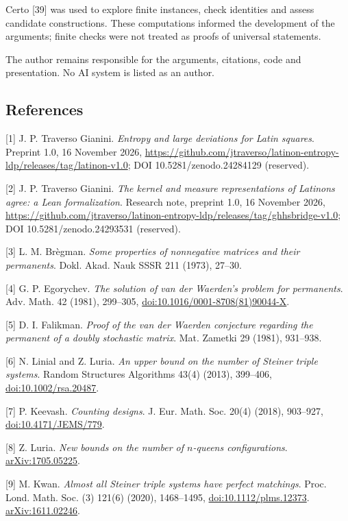 \documentclass[english,11pt,a4paper]{article}
\begin{document}
Certo {[}39{]} was used to explore finite instances, check identities and assess candidate constructions. These computations informed the development of the arguments; finite checks were not treated as proofs of universal statements.

The author remains responsible for the arguments, citations, code and presentation. No AI system is listed as an author.

\subsection{References}\label{references}
\begingroup\small\sloppy

{[}1{]} J. P. Traverso Gianini. \emph{Entropy and large deviations for Latin squares}. Preprint 1.0, 16 November 2026, \url{https://github.com/jtraverso/latinon-entropy-ldp/releases/tag/latinon-v1.0}; DOI 10.5281/zenodo.24284129 (reserved).

{[}2{]} J. P. Traverso Gianini. \emph{The kernel and measure representations of Latinons agree: a Lean formalization}. Research note, preprint 1.0, 16 November 2026, \url{https://github.com/jtraverso/latinon-entropy-ldp/releases/tag/ghhsbridge-v1.0}; DOI 10.5281/zenodo.24293531 (reserved).

{[}3{]} L. M. Brègman. \emph{Some properties of nonnegative matrices and their permanents}. Dokl. Akad. Nauk SSSR 211 (1973), 27--30.

{[}4{]} G. P. Egorychev. \emph{The solution of van der Waerden's problem for permanents}. Adv. Math. 42 (1981), 299--305, \href{https://doi.org/10.1016/0001-8708(81)90044-X}{doi:10.1016/0001-8708(81)90044-X}.

{[}5{]} D. I. Falikman. \emph{Proof of the van der Waerden conjecture regarding the permanent of a doubly stochastic matrix}. Mat. Zametki 29 (1981), 931--938.

{[}6{]} N. Linial and Z. Luria. \emph{An upper bound on the number of Steiner triple systems}. Random Structures Algorithms 43(4) (2013), 399--406, \href{https://doi.org/10.1002/rsa.20487}{doi:10.1002/rsa.20487}.

{[}7{]} P. Keevash. \emph{Counting designs}. J. Eur. Math. Soc. 20(4) (2018), 903--927, \href{https://doi.org/10.4171/JEMS/779}{doi:10.4171/JEMS/779}.

{[}8{]} Z. Luria. \emph{New bounds on the number of \(n\)-queens configurations}. \href{https://arxiv.org/abs/1705.05225}{arXiv:1705.05225}.

{[}9{]} M. Kwan. \emph{Almost all Steiner triple systems have perfect matchings}. Proc. Lond. Math. Soc. (3) 121(6) (2020), 1468--1495, \href{https://doi.org/10.1112/plms.12373}{doi:10.1112/plms.12373}. \href{https://arxiv.org/abs/1611.02246}{arXiv:1611.02246}.
\end{document}
